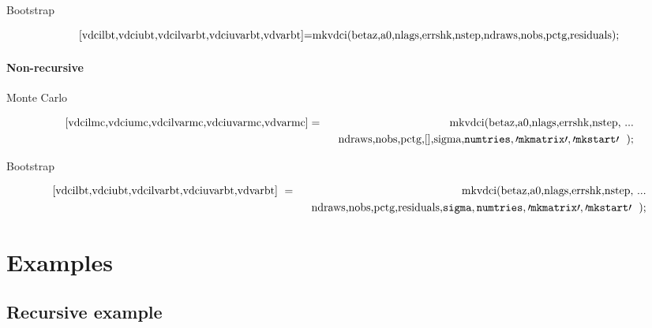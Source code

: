 \documentclass{article}
\begin{document}
Bootstrap

\begin{equation*}
\text{\lbrack
vdcilbt,vdciubt,vdcilvarbt,vdciuvarbt,vdvarbt]=mkvdci(betaz,a0,nlags,errshk,nstep,ndraws,nobs,pctg,residuals);%
}
\end{equation*}

\paragraph{Non-recursive}

Monte Carlo

\begin{eqnarray*}
\text{\lbrack vdcilmc,vdciumc,vdcilvarmc,vdciuvarmc,vdvarmc]} &=&\text{%
mkvdci(betaz,a0,nlags,errshk,nstep, ...} \\
&&\text{ndraws,nobs,pctg,[],sigma}{\tiny ,}\mathtt{numtries,\prime
mkmatrix\prime ,\prime mkstart\prime }\text{)};
\end{eqnarray*}

Bootstrap

\begin{eqnarray*}
\text{\lbrack vdcilbt,vdciubt,vdcilvarbt,vdciuvarbt,vdvarbt] } &=&\text{
mkvdci(betaz,a0,nlags,errshk,nstep, ...} \\
&&\text{ndraws,nobs,pctg,residuals,}\mathtt{sigma,numtries,\prime
mkmatrix\prime ,\prime mkstart\prime }\text{);}
\end{eqnarray*}

\section{Examples}

\subsection{Recursive example}
\end{document}
